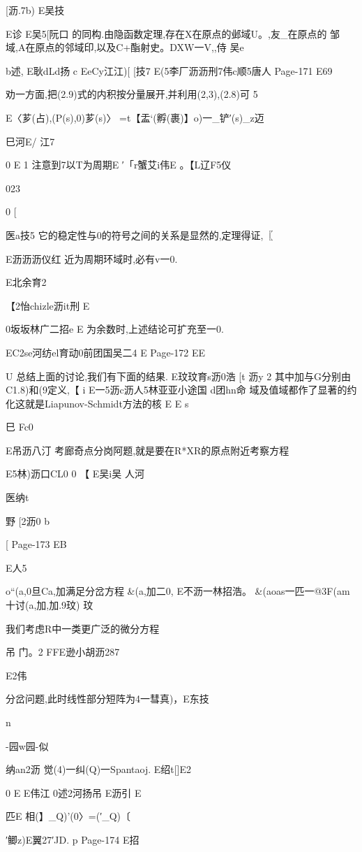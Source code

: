 {{{{{{{{{{{{{{{{{{[沥.7b)
E吴技

E诊
E吴5[阮口
的同构.由隐函数定理,存在X在原点的邺域U。,友_在原点的
邹域,A在原点的邻域印,以及C+酯射史。DXW一V,,侍
吴e

b述,
E耿dLd扬
c
EeCy江江)[
[技7
E(5李厂沥沥刑7伟c顺5唐人
Page-171
E69

劝一方面,把(2.9)式的内积按分量展开,并利用(2,3),(2.8)可
5

E〈芗(占),(P(s),0)芗(s)〉
=t【盂`(孵(裹)】o)一_铲′(s)_z迈

巳河E/
江7

0
E
1
注意到7以T为周期E
′「r蟹艾i伟E
。【L辽F5仪

023

0
[

医a技5
它的稳定性与0的符号之间的关系是显然的,定理得证,〖

E沥沥沥仪红
近为周期环域时,必有v一0.

E北余育2

【2怡chizle沥it刑
E

0坂坂林广二招e
E
为余数时,上述结论可扩充至一0.

EC2se河纺el育动0前团国吴二4
E
Page-172
EE

U
总结上面的讨论,我们有下面的结果.
E玟玟育s沥0浩
[t
沥y
2
其中加与G分别由C1.8)和(9定义,【
i
E一5沥c沥人5林亚亚小途国
d团hn命
域及值域都作了显著的约化这就是Liapunov-Schmidt方法的核
E
E
s

巳
Fc0

E吊沥八汀
考廊奇点分岗阿题,就是要在R*XR的原点附近考察方程

E5林)沥口CL0
0
【
E吴i吴
人河

医纳t

野
[2沥0
b

[
Page-173
EB

E人5

o“(a,0旦Ca,加满足分岔方程
&(a,加二0,
E不沥一林招浩。
&(aoas一匹一@3F(am十讨(a,加,加.9玟)
玟

我们考虑R中一类更广泛的微分方程

吊
门。2
FFE逊小胡沥287

E2伟

分岔问题,此时线性部分短阵为4一彗真)，E东技

n

-园w园-似

纳an2沥
觉(4)一纠(Q)一Spantaoj.
E绍t[]E2

0
E
E伟江
0述2河扬吊
E沥引
E

匹E
相(】_Q)'(0〉=(′_Q)〔

′鲫z)E翼27′JD.
p
Page-174
E招

}}}}}}}}}}}}}}}}}}
